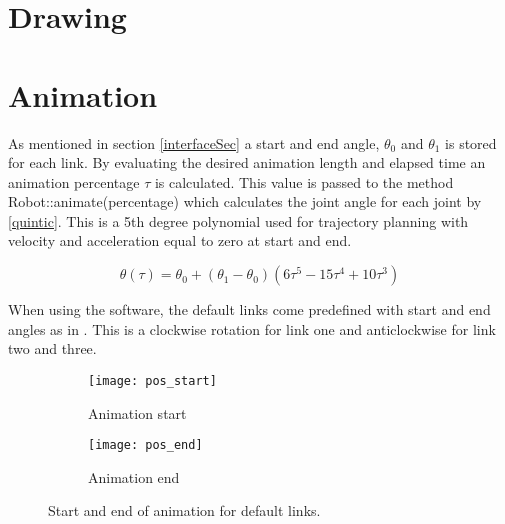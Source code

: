 \section{Drawing}


\section{Animation}

As mentioned in section \ref{interfaceSec} a start and end angle, $\theta_0$ and $\theta_1$ is stored for each link. By evaluating the desired animation length and elapsed time an animation percentage $\tau$ is calculated. This value is passed to the method \textsf{Robot::animate(percentage)} which calculates the joint angle for each joint by \eqref{quintic}. This is a 5th degree polynomial used for trajectory planning with velocity and acceleration equal to zero at start and end.

\begin{equation}\label{quintic}
\theta\left ( \tau \right ) = \theta_0 + \left ( \theta_1 - \theta_0\right )\left ( 6 \tau^5-15\tau^4 + 10\tau^3\right )
\end{equation}

When using the software, the \textsf{default links} come predefined with start and end angles as in . This is a clockwise rotation for link one and anticlockwise for link two and three.

\begin{figure}[ht!]
\begin{subfigure}[b]{0.35\textwidth}
    \centering
    \texttt{[image: pos\_start]}
    \caption{Animation start}
\end{subfigure}
\hfill
\begin{subfigure}[b]{0.4\textwidth}
    \centering
    \texttt{[image: pos\_end]}
    \caption{Animation end}
\end{subfigure}
\caption{Start and end of animation for default links.}
\label{animation}
\end{figure}